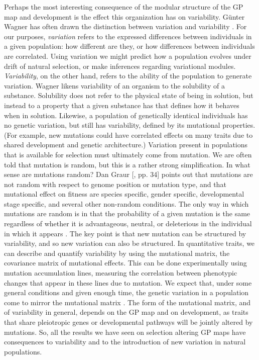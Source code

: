 \begin{refsection}
Perhaps the most interesting consequence of the modular structure of the
GP map and development is the effect this organization has on
variability. Günter Wagner has
often drawn the distinction between variation and variability
\parencite{Wagner1996-ui}. For our purposes, \emph{variation} refers to the
expressed differences between individuals in a given population: how
different are they, or how differences between individuals are
correlated. Using variation we might predict how a population evolves
under drift of natural selection, or make inferences regarding
variational modules. \emph{Variability}, on the other hand, refers to
the ability of the population to generate variation. Wagner likens
variability of an organism to the solubility of a substance. Solubility
does not refer to the physical state of being in solution, but instead
to a property that a given substance has that defines how it behaves
when in solution. Likewise, a population of genetically identical
individuals has no genetic variation, but still has variability, defined
by its mutational properties. (For example, new mutations could have
correlated effects on many traits due to shared development and genetic
architecture.) Variation present in populations that is available for
selection must ultimately come from mutation. We are often told that
mutation is random, but this is a rather strong simplification. In what
sense are mutations random? Dan Graur {[}\textcite{Graur2015-th}, pp. 34{]}
points out that mutations are not random with respect to genome position
or mutation type, and that mutational effect on fitness are species
specific, gender specific, developmental stage specific, and several
other non-random conditions. The only way in which mutations are random
is in that the probability of a given mutation is the same regardless of
whether it is advantageous, neutral, or deleterious in the individual in
which it appears \parencite{Luria1943-se}. The key point is that new mutation
can be structured by variability, and so new variation can also be
structured. In quantitative traits, we can describe and quantify
variability by using the mutational matrix, the covariance matrix of
mutational effects. This can be done experimentally using mutation
accumulation lines, measuring the correlation between phenotypic changes
that appear in these lines due to mutation. We expect that, under some
general conditions and given enough time, the genetic variation in a
population come to mirror the mutational matrix
\parencite{Lande1980-kn, Cheverud1984-mi, Jones2007-xe}. The form of the
mutational matrix, and of variability in general, depends on the GP map
and on development, as traits that share pleiotropic genes or
developmental pathways will be jointly altered by mutations. So, all the
results we have seen on selection altering GP maps have consequences to
variability and to the introduction of new variation in natural
populations.


\end{refsection}
